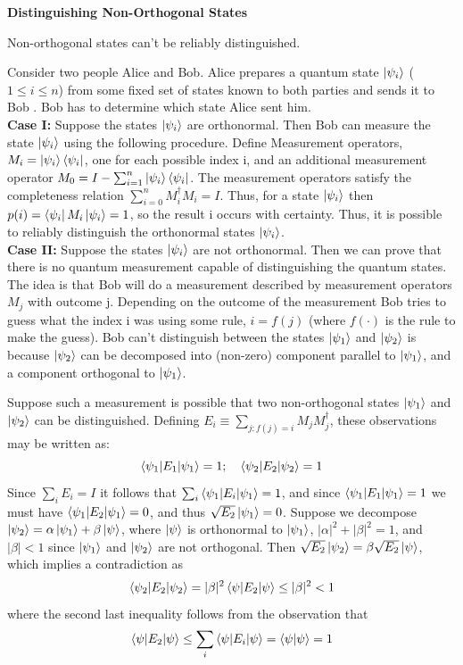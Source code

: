 \begin{importantnote}
    \textbf{Distinguishing Non-Orthogonal States}
    \begin{theorem}
        Non-orthogonal states can't be reliably distinguished.
    \end{theorem}
    Consider two people Alice and Bob. Alice prepares a quantum state $\ket{\psi_i}$ ($1\leq i\leq n$) from some fixed set of states known to both parties and sends it to Bob . Bob has to determine which state Alice sent him.\\
\textbf{Case I: }
    Suppose the states $\ket{\psi_i}$ are orthonormal. Then Bob can measure the state $\ket{\psi_i}$ using the following procedure. Define Measurement operators, $M_i=\ket{\psi_i}\bra{\psi_i}$, one for each possible index i, and an additional 
    measurement operator $M_0=I-\sum_{i=1}^{n}\ket{\psi_i}\bra{\psi_i}$. The measurement operators satisfy the completeness relation $\sum_{i=0}^{n}M_i^{\dagger}M_i=I$. Thus, for a state $\ket{\psi_i}$ then $p(i)=\bra{\psi_i}M_i\ket{\psi_i}=1$, so the result i occurs
    with certainty. Thus, it is possible to reliably distinguish the orthonormal states $\ket{\psi_i}$.\\
\textbf{Case II:}
    Suppose the states $\ket{\psi_i}$ are not orthonormal. Then we can prove that there is no quantum measurement 
    capable of distinguishing the quantum states. The idea is that Bob will do a measurement described by measurement operators $M_j$ with 
    outcome j. Depending on the outcome of the measurement Bob tries to guess what the index i was using some rule,
    $i=f(j)$ (where $f(\cdot)$ is the rule to make the guess). Bob can't distinguish between the states $\ket{\psi_1}$ and $\ket{\psi_2}$ 
    is because $\ket{\psi_2}$ can be decomposed into (non-zero) component parallel to $\ket{\psi_1}$, and a component orthogonal to $\ket{\psi_1}$.
    \begin{example}
        Suppose such a measurement is possible that two non-orthogonal states $\ket{\psi_1}$ and $\ket{\psi_2}$ can be distinguished. Defining $E_i\equiv \sum_{j:f(j)=i} M_jM_j^{\dagger}$, these observations may be written as:
        \[
        \braket{\psi_1|E_1|\psi_1}=1; \quad \braket{\psi_2|E_2|\psi_2}=1
        \]
        Since $\sum_iE_i=I$ it follows that $\sum_i \braket{\psi_1|E_i|\psi_1}=1$, and since $\braket{\psi_1|E_1|\psi_1}=1$ we must have $\braket{\psi_1|E_2|\psi_1}=0$, and thus $\sqrt{E_2}\ket{\psi_1}=0$. Suppose we decompose $\ket{\psi_2}=\alpha\ket{\psi_1}+\beta\ket{\psi}$, where $\ket{\psi}$ is orthonormal to $\ket{\psi_1}$, $|\alpha|^2+|\beta|^2=1$, and $|\beta|<1$ since $\ket{\psi_1}$ and $\ket{\psi_2}$ are not orthogonal. Then $\sqrt{E_2}\ket{\psi_2}=\beta\sqrt{E_2}\ket{\psi}$, which implies a contradiction as
        \[
        \braket{\psi_2|E_2|\psi_2}=|\beta|^2\braket{\psi|E_2|\psi}\leq |\beta|^2 < 1
        \]
        where the second last inequality follows from the observation that
        \[
        \braket{\psi|E_2|\psi} \leq \sum_i \braket{\psi|E_i|\psi}=\braket{\psi|\psi} = 1
        \]
    \end{example}
\end{importantnote}


